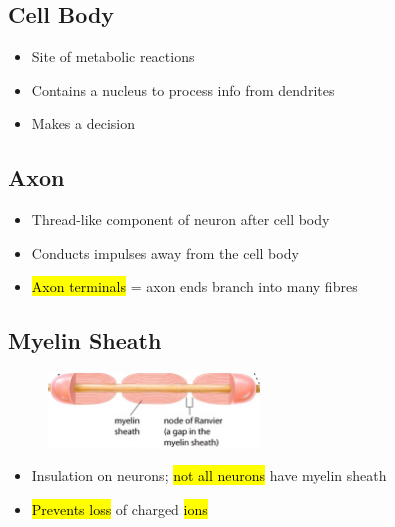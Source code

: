 \documentclass[a4paper,12pt]{article}
\begin{document}
\subsection{Cell Body}
\begin{itemize}
    \item{Site of metabolic reactions}
    \item{Contains a nucleus to process info from dendrites}
    \item{Makes a decision}
\end{itemize}

\subsection{Axon}
\begin{itemize}
    \item{Thread-like component of neuron after cell body}
    \item{Conducts impulses away from the cell body}
    \item{\hl{Axon terminals} = axon ends branch into many fibres}
\end{itemize}

\subsection{Myelin Sheath}
\begin{figure}[H]
    \centering
    \includegraphics[width=0.50\textwidth]{ranvier}
\end{figure}

\begin{itemize}
    \item{Insulation on neurons; \hl{not all neurons} have myelin sheath}
    \item{\hl{Prevents loss} of charged \hl{ions}}
\end{itemize}
\end{document}
